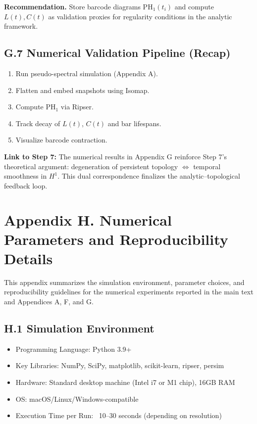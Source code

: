 \documentclass[11pt]{article}
\theoremstyle{definition}
\begin{document}
\textbf{Recommendation.} Store barcode diagrams $\mathrm{PH}_1(t_i)$ and compute $L(t), C(t)$ as validation proxies for regularity conditions in the analytic framework.

\subsection*{G.7 Numerical Validation Pipeline (Recap)}
\begin{enumerate}
    \item Run pseudo-spectral simulation (Appendix A).
    \item Flatten and embed snapshots using Isomap.
    \item Compute $\mathrm{PH}_1$ via Ripser.
    \item Track decay of $L(t)$, $C(t)$ and bar lifespans.
    \item Visualize barcode contraction.
\end{enumerate}

\textbf{Link to Step 7:} The numerical results in Appendix G reinforce Step 7's theoretical argument: degeneration of persistent topology $\Leftrightarrow$ temporal smoothness in $H^1$. This dual correspondence finalizes the analytic--topological feedback loop.


\section{Appendix H. Numerical Parameters and Reproducibility Details}
\label{sec:appendixH}

This appendix summarizes the simulation environment, parameter choices, and reproducibility guidelines for the numerical experiments reported in the main text and Appendices A, F, and G.

\subsection*{H.1 Simulation Environment}

\begin{itemize}
  \item Programming Language: Python 3.9+
  \item Key Libraries: NumPy, SciPy, matplotlib, scikit-learn, ripser, persim
  \item Hardware: Standard desktop machine (Intel i7 or M1 chip), 16GB RAM
  \item OS: macOS/Linux/Windows-compatible
  \item Execution Time per Run: ~10–30 seconds (depending on resolution)
\end{itemize}
\end{document}
